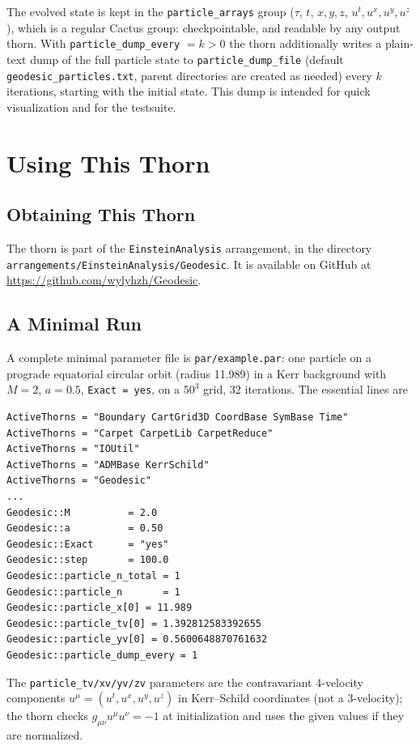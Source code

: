 \documentclass{article}
\begin{document}
The evolved state is kept in the \texttt{particle\_arrays} group
($\tau$, $t$, $x, y, z$, $u^t, u^x, u^y, u^z$), which is a regular
Cactus group: checkpointable, and readable by any output thorn.
With \texttt{particle\_dump\_every} $= k > 0$ the thorn additionally
writes a plain-text dump of the full particle state to
\texttt{particle\_dump\_file} (default
\texttt{geodesic\_particles.txt}, parent directories are created as
needed) every $k$ iterations, starting with the initial state.  This
dump is intended for quick visualization and for the testsuite.

\section{Using This Thorn}

\subsection{Obtaining This Thorn}

The thorn is part of the \texttt{EinsteinAnalysis} arrangement, in the
directory \texttt{arrangements/EinsteinAnalysis/Geodesic}.  It is
available on GitHub at
\url{https://github.com/wylyhzh/Geodesic}.

\subsection{A Minimal Run}

A complete minimal parameter file is
\texttt{par/example.par}: one particle on a prograde equatorial
circular orbit (radius 11.989) in a Kerr background with $M = 2$,
$a = 0.5$, \texttt{Exact = yes}, on a $50^3$ grid, 32 iterations.
The essential lines are
\begin{verbatim}
ActiveThorns = "Boundary CartGrid3D CoordBase SymBase Time"
ActiveThorns = "Carpet CarpetLib CarpetReduce"
ActiveThorns = "IOUtil"
ActiveThorns = "ADMBase KerrSchild"
ActiveThorns = "Geodesic"
...
Geodesic::M          = 2.0
Geodesic::a          = 0.50
Geodesic::Exact      = "yes"
Geodesic::step       = 100.0
Geodesic::particle_n_total = 1
Geodesic::particle_n       = 1
Geodesic::particle_x[0] = 11.989
Geodesic::particle_tv[0] = 1.392812583392655
Geodesic::particle_yv[0] = 0.5600648870761632
Geodesic::particle_dump_every = 1
\end{verbatim}
The \texttt{particle\_tv/xv/yv/zv} parameters are the contravariant
4-velocity components $u^\mu = (u^t, u^x, u^y, u^z)$ in Kerr--Schild
coordinates (not a 3-velocity); the thorn checks
$g_{\mu\nu}u^\mu u^\nu = -1$ at initialization and uses the given
values if they are normalized.
\end{document}
